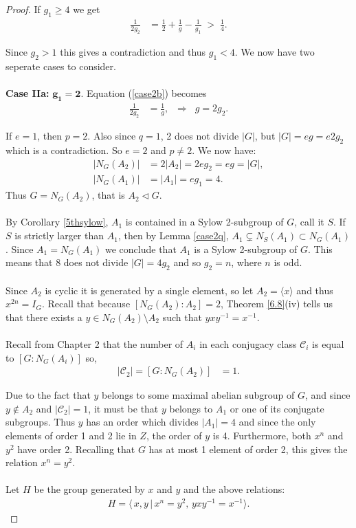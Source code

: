 \begin{proof}
If $g_1 \geq 4$ we get
\begin{align*} \frac{1}{2g_2} &= \frac{1}{2} + \frac{1}{g} - \frac{1}{g_1} \; > \; \frac{1}{4}.
\end{align*}

Since $g_2 > 1$  this gives a contradiction and thus $g_1 < 4$. We now have two seperate cases to consider.\\
\\
 \space \textbf{Case IIa:} $\pmb{g_1 = 2}$. Equation (\ref{case2b}) becomes
\begin{align*} \frac{1}{2g_2} &= \frac{1}{g}, \; \; \Longrightarrow \; \; g = 2g_2.
\end{align*}

If $e=1$, then $p=2$. Also since $q=1$, 2 does not divide $|G|$, but $|G| = eg = e2g_2$ which is a contradiction. So $e=2$ and $p \neq 2$. We now have:
\begin{align*} |N_G(A_2)| &= 2|A_2|  = 2eg_2 = eg = |G|,  \tag{since $s+t = 2$}
\\ |N_G(A_1)| &= |A_1| = eg_1 = 4. \tag{since $s=1$} 
\end{align*}
Thus $G = N_G(A_2)$, that is $A_2 \vartriangleleft G$.\\
\\
By Corollary \ref{5thsylow}, $A_1$ is contained in a Sylow 2-subgroup of $G$, call it $S$. If $S$ is strictly larger than $A_1$, then by Lemma \ref{case2q}, $A_1 \subsetneq N_S(A_1) \subset N_G(A_1)$. Since $A_1 = N_G(A_1)$ we conclude that $A_1$ is a Sylow 2-subgroup of $G$. This means that 8 does not divide $|G| = 4g_2$ and so $g_2 = n$, where $n$ is odd. \\
\\
Since $A_2$ is cyclic it is generated by a single element, so let $A_2 = \langle x \rangle$ and thus $x^{2n}= I_G$.  Recall that because $[N_G(A_2): A_2] = 2$, Theorem \ref{6.8}(iv) tells us that there exists a $y \in N_G(A_2) \! \setminus \! A_2$ such that $yxy^{-1} = x^{-1}$. \\
\\
Recall from Chapter 2 that the number of $A_i$ in each conjugacy class $\mathcal{C}_i$ is equal to $[G : N_G(A_i)]$ so,
\begin{align*}  |\mathcal{C}_2| = [G:N_G(A_2)] &= 1.
\end{align*}

Due to the fact that $y$ belongs to some maximal abelian subgroup of $G$, and since $y \not \in A_2$ and $|\mathcal{C}_2| = 1$, it must be that $y$ belongs to $A_1$ or one of its conjugate subgroups. Thus $y$ has an order which divides $|A_1| = 4$ and since the only elements of order 1 and 2 lie in $Z$, the order of $y$ is 4. Furthermore, both $x^n$ and $y^2$ have order 2. Recalling that $G$ has at most 1 element of order 2, this gives the relation $x^n = y^2$. \\ 
\\
Let $H$ be the group generated by $x$ and $y$ and the above relations:
\begin{align*} H = \langle \, x,y \, | \, x^n = y^2, \, yxy^{-1} = x^{-1} \rangle.
\end{align*}


\end{proof}
